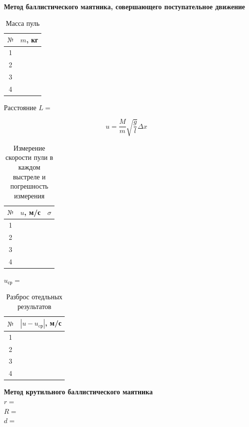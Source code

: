 \documentclass[a4paper,12pt]{article} %
\begin{document}
\textbf{ Метод баллистического маятника, совершающего поступательное движение}
\begin{table}[h]
\caption{Масса пуль}
\centering
\begin{tabular}{|c|p{2cm}|}
\hline
$\text{№}$ & $m$, кг \\ \hline
1 & \\ \hline
2 & \\ \hline
3& \\ \hline
4 & \\ \hline
\end{tabular}
\end{table}

Расстояние $L = $

\[u = \frac{M}{m}\sqrt{\frac{g}{l}}\Delta x\]
\begin{table}[h]
\centering
\caption{Измерение скорости пули в каждом выстреле и погрешность измерения}
\begin{tabular}{|c|p{2cm}|p{2cm}|}
\hline
$\text{№}$ & $u$, м/с & $\sigma$ \\ \hline
1 & &\\ \hline
2 & &\\ \hline
3& &\\ \hline
4 & &\\ \hline
\end{tabular}
\end{table}

$u_\text{ср}=$
\begin{table}[h]
\centering
\caption{Разброс отедльных результатов}
\begin{tabular}{|c|p{3cm}|}
\hline
$\text{№}$ & $|u-u_\text{cр}|$, м/с  \\ \hline
1 & \\ \hline
2 & \\ \hline
3& \\ \hline
4 & \\ \hline
\end{tabular}
\end{table}
\newpage
\textbf{Метод крутильного баллистического маятника}\\

$r = $\\

$R = $\\

$d =$\\
\end{document}
